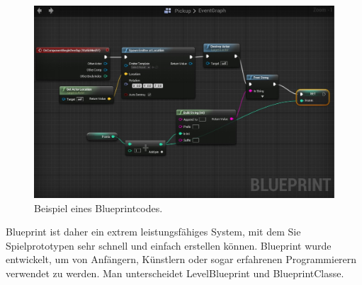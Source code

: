 \begin{figure}[h] \centering
\includegraphics[width=13cm]{Images/blueprint.png} 
\caption{ Beispiel eines Blueprintcodes. }
\label{vr-blueprint} 
\end{figure}

Blueprint ist daher ein extrem leistungsf{\"a}higes System, mit dem Sie Spielprototypen sehr schnell und einfach erstellen k{\"o}nnen. 
Blueprint wurde entwickelt, um von Anf{\"a}ngern, K{\"u}nstlern oder sogar erfahrenen Programmierern verwendet zu werden. 
Man unterscheidet LevelBlueprint und BlueprintClasse.




